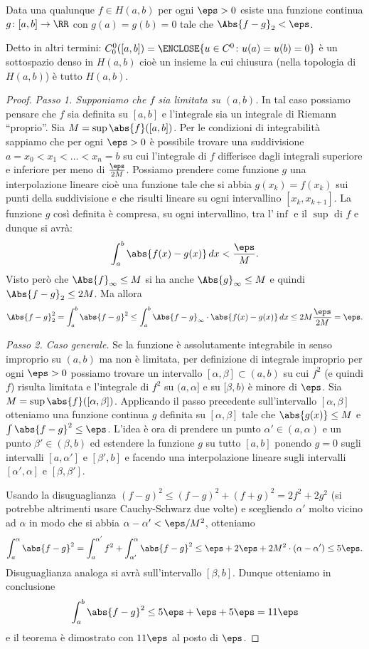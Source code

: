 \begin{theorem}
Data una qualunque $f\in H(a, b)$ per ogni $\eps>0$
esiste una funzione continua $g\colon [a,b]\to \RR$
con $g(a)=g(b)=0$ tale che $\Abs{f-g}_2<\eps$.

Detto in altri termini: $C^0_0([a,b])=\ENCLOSE{u\in C^0\colon u(a)=u(b)=0}$ è un 
sottospazio denso in $H(a,b)$
cioè un insieme la cui chiusura (nella topologia di $H(a,b)$) 
è tutto $H(a,b)$.
\end{theorem}
%
\begin{proof}
\emph{Passo 1. Supponiamo che $f$ sia limitata su $(a,b)$.}
In tal caso possiamo pensare che $f$ sia definita su $[a,b]$
e l'integrale sia un integrale di Riemann ``proprio''.
Sia $M=\sup \abs{f}([a,b])$.
Per le condizioni di integrabilità sappiamo che per ogni $\eps>0$ è possibile
trovare una suddivisione $a=x_0 < x_1 < \dots < x_n =b$ su cui l'integrale
di $f$ differisce dagli integrali superiore e inferiore per meno di $\frac{\eps}{2M}$.
Possiamo prendere come funzione $g$ una interpolazione lineare
cioè una funzione tale che si abbia $g(x_k) = f(x_k)$ sui punti della suddivisione
e che risulti lineare su ogni intervallino $[x_k,x_{k+1}]$. La funzione
$g$ così definita è compresa, su ogni intervallino, tra l'$\inf$ e il $\sup$
di $f$ e dunque si avrà:
\[
 \int_a^b \abs{f(x)-g(x)}\, dx < \frac{\eps}{M}.
\]
Visto però che $\Abs{f}_\infty\le M$
si ha anche $\Abs{g}_\infty\le M$ e quindi $\Abs{f-g}_2\le 2M$.
Ma allora
\[
  \Abs{f-g}_2^2 = \int_a^b \abs{f-g}^2
  \le \int_a^b \Abs{f-g}_\infty \cdot \abs{f(x)-g(x)}\, dx
  \le 2M \frac{\eps}{2M} = \eps.
\]

\emph{Passo 2. Caso generale.}
Se la funzione è assolutamente 
integrabile in senso improprio su $(a,b)$ ma non è limitata, per
definizione di integrale improprio per ogni $\eps>0$ possiamo trovare un intervallo
$[\alpha,\beta]\subset (a,b)$
su cui $f^2$ (e quindi $f$) risulta limitata e
l'integrale di $f^2$ su $(a,\alpha]$ e su $[\beta,b)$
è minore di $\eps$. 
Sia $M=\sup \abs{f}([\alpha,\beta])$.
Applicando il passo precedente sull'intervallo $[\alpha,\beta]$ 
otteniamo una funzione continua $g$ definita su $[\alpha,\beta]$ 
tale che $\abs{g(x)}\le M$
e $\int\abs{f-g}^2\le \eps$.
L'idea è ora di prendere un punto $\alpha'\in(a,\alpha)$ 
e un punto $\beta'\in(\beta,b)$ ed estendere la funzione 
$g$ su tutto $[a,b]$ ponendo $g=0$ sugli intervalli 
$[a,\alpha']$ e $[\beta',b]$ e facendo una interpolazione 
lineare sugli intervalli $[\alpha',\alpha]$ e $[\beta,\beta']$.

Usando la disuguaglianza 
$(f-g)^2 \le (f-g)^2+(f+g)^2 = 2f^2+2g^2$
(si potrebbe altrimenti usare Cauchy-Schwarz due volte)
e scegliendo $\alpha'$ molto vicino ad 
$\alpha$ in modo che si abbia $\alpha-\alpha'<\eps/M^2$,
otteniamo
\[
  \int_a^\alpha \abs{f-g}^2 
  = \int_a^{\alpha'} f^2 + \int_{\alpha'}^\alpha \abs{f-g}^2
  \le \eps + 2\eps + 2M^2\cdot(\alpha-\alpha')
  \le 5\eps.
\]
Disuguaglianza analoga si avrà sull'intervallo $[\beta,b]$.
Dunque otteniamo in conclusione 
\[
\int_a^b \abs{f-g}^2
\le 5\eps + \eps + 5\eps  = 11 \eps
\]
e il teorema è dimostrato con $11\eps$ al posto di $\eps$.
\end{proof}

